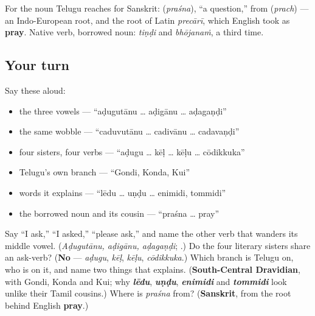 \begin{cousinweb}
For the noun Telugu reaches for Sanskrit: \textbf{} (\emph{praśna}), \textquotedblleft{}a question,\textquotedblright{} from \textbf{} (\emph{prach}) — an Indo-European root, and the root of Latin \emph{precārī}, which English took as \textbf{pray}. Native verb, borrowed noun: \emph{tiṇḍi} and \emph{bhōjanaṁ}, a third time.
\end{cousinweb}

\subsection*{Your turn}
Say these aloud:

\begin{itemize}
\raggedright
  \item the three vowels — \textquotedblleft{}aḍugutānu … aḍigānu … aḍagaṇḍi\textquotedblright{}
  \item the same wobble — \textquotedblleft{}caduvutānu … cadivānu … cadavaṇḍi\textquotedblright{}
  \item four sisters, four verbs — \textquotedblleft{}aḍugu … kēḷ … kēḷu … cōdikkuka\textquotedblright{}
  \item Telugu's own branch — \textquotedblleft{}Gondi, Konda, Kui\textquotedblright{}
  \item words it explains — \textquotedblleft{}lēdu … uṇḍu … enimidi, tommidi\textquotedblright{}
  \item the borrowed noun and its cousin — \textquotedblleft{}praśna … pray\textquotedblright{}
\end{itemize}

\begin{tcolorbox}[breakable,colback=teal!4,colframe=teal!35!black,title={Before you move on}]
Say \textquotedblleft{}I ask,\textquotedblright{} \textquotedblleft{}I asked,\textquotedblright{} \textquotedblleft{}please ask,\textquotedblright{} and name the other verb that wanders its middle vowel. (\emph{Aḍugutānu, aḍigānu, aḍagaṇḍi}; \textbf{}.) Do the four literary sisters share an ask-verb? (\textbf{No} — \emph{aḍugu}, \emph{kēḷ}, \emph{kēḷu}, \emph{cōdikkuka}.) Which branch is Telugu on, who is on it, and name two things that explains. (\textbf{South-Central Dravidian}, with Gondi, Konda and Kui; why \emph{\textbf{lēdu}}, \emph{\textbf{uṇḍu}}, \emph{\textbf{enimidi}} and \emph{\textbf{tommidi}} look unlike their Tamil cousins.) Where is \emph{praśna} from? (\textbf{Sanskrit}, from the root behind English \textbf{pray}.)
\end{tcolorbox}

